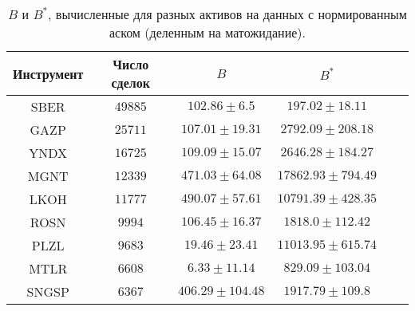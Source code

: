     \begin{table}[h!]
        \begin{center}
            \begin{tabular}{|c|c|c|c|c|c|}
                \hline
                Инструмент        & Число сделок & $B$ & $B ^*$ \\ \hline
                SBER & $49885$ & $102.86 \pm 6.5$ & $197.02 \pm 18.11$ \\ \hline 
                GAZP & $25711$ & $107.01 \pm 19.31$ & $2792.09 \pm 208.18$ \\ \hline 
                YNDX & $16725$ & $109.09 \pm 15.07$ & $2646.28 \pm 184.27$ \\ \hline 
                MGNT & $12339$ & $471.03 \pm 64.08$ & $17862.93 \pm 794.49$ \\ \hline 
                LKOH & $11777$ & $490.07 \pm 57.61$ & $10791.39 \pm 428.35$ \\ \hline 
                ROSN & $9994$ & $106.45 \pm 16.37$ & $1818.0 \pm 112.42$ \\ \hline 
                PLZL & $9683$ & $19.46 \pm 23.41$ & $11013.95 \pm 615.74$ \\ \hline 
                MTLR & $6608$ & $6.33 \pm 11.14$ & $829.09 \pm 103.04$ \\ \hline 
                SNGSP & $6367$ & $406.29 \pm 104.48$ & $1917.79 \pm 109.8$ \\ \hline 
    
            \end{tabular}
        \end{center}
        \label{RD_SE_2}
        \caption{$B$ и $B ^*$, вычисленные для разных активов на данных с нормированным аском (деленным на матожидание).}
        \end{table} 

    